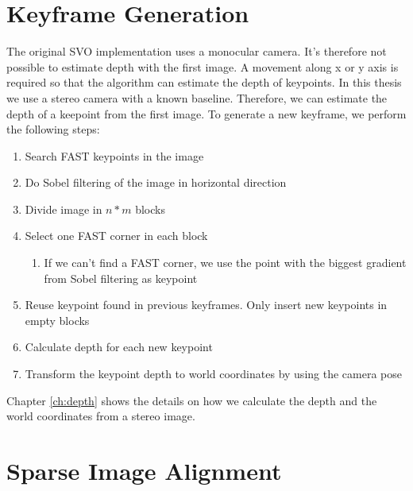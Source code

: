 \documentclass[11pt,a4paper,titlepage,oneside]{report}
\begin{document}
\section{Keyframe Generation}\label{sec:initialization}
The original SVO implementation uses a monocular camera. It's therefore not possible to estimate depth with the first image. A movement along x or y axis is required so that the algorithm can estimate the depth of keypoints. In this thesis we use a stereo camera with a known baseline. Therefore, we can estimate the depth of a keepoint from the first image. To generate a new keyframe, we perform the following steps:
\begin{enumerate}
  \item{Search FAST keypoints in the image \cite{fast}}
  \item{Do Sobel filtering of the image in horizontal direction}
  \item{Divide image in $n*m$ blocks}
  \item{Select one FAST corner in each block}
		\begin{enumerate}
			\item{If we can't find a FAST corner, we use the point with the biggest gradient from Sobel filtering as keypoint}
		\end{enumerate}
	\item{Reuse keypoint found in previous keyframes. Only insert new keypoints in empty blocks}
  \item{Calculate depth for each new keypoint}
  \item{Transform the keypoint depth to world coordinates by using the camera pose}
\end{enumerate}

Chapter \ref{ch:depth} shows the details on how we calculate the depth and the world coordinates from a stereo image.

\section{Sparse Image Alignment}\label{sec:sia}
\end{document}
